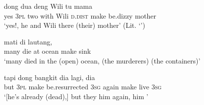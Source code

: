 \ea
\label{Example_5.135}
 {dong} {dua} {deng} {Wili} {tu} {} {} {mama}\\ %
 yes  \textsc{3pl}  two  with  Wili  \textsc{d.dist}  make  be.dizzy  mother\\
\glt 
‘yes!, he and Wili there  (their) mother’ (Lit. ‘’) \textstyleExampleSource{[081011-003-Cv.0002]}
\z

\ea
\label{Example_5.136}
 {mati} {di} {lautang,} {} {}\\ %
 many  die  at  ocean  make  sink\\
 ‘many died in the (open) ocean, (the murderers)  (the containers)’ \textstyleExampleSource{[Elicited BR131103.003]}
\z

\ea
\label{Example_5.137}
\gll {{\ldots}} {tapi} {dong} {} {bangkit} {dia} {lagi,} {} {} {dia}\\ %
{}   but  \textsc{3pl}  make  be.resurrected  \textsc{3sg}  again  make  live  \textsc{3sg}\\
 ‘[he’s already (dead),] but they  him again,  him ’ \textstyleExampleSource{[Elicited BR131103.005]}
\z



